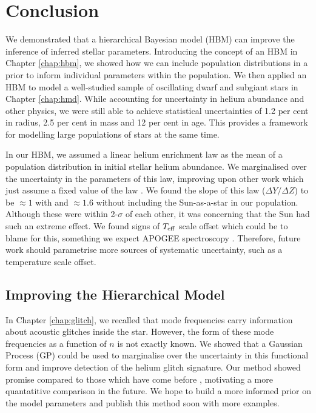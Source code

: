 %
%
%
%
%
\chapter{Conclusion}

We demonstrated that a hierarchical Bayesian model (HBM) can improve the inference of inferred stellar parameters. Introducing the concept of an HBM in Chapter \ref{chap:hbm}, we showed how we can include population distributions in a prior to inform individual parameters within the population. We then applied an HBM to model a well-studied sample of oscillating dwarf and subgiant stars in Chapter \ref{chap:hmd}. While accounting for uncertainty in helium abundance and other physics, we were still able to achieve statistical uncertainties of 1.2 per cent in radius, 2.5 per cent in mass and 12 per cent in age. This provides a framework for modelling large populations of stars at the same time.

In our HBM, we assumed a linear helium enrichment law as the mean of a population distribution in initial stellar helium abundance. We marginalised over the uncertainty in the parameters of this law, improving upon other work which just assume a fixed value of the law \citep[e.g.][]{Serenelli.Johnson.ea2017}. We found the slope of this law (\(\Delta Y/\Delta Z\)) to be \(\approx 1\) with and \(\approx 1.6\) without including the Sun-as-a-star in our population. Although these were within 2-\(\sigma\) of each other, it was concerning that the Sun had such an extreme effect. We found signs of \({T_\mathrm{eff}}\) scale offset which could be to blame for this, something we expect APOGEE spectroscopy \needcite. Therefore, future work should parametrise more sources of systematic uncertainty, such as a temperature scale offset.

\section{Improving the Hierarchical Model}

In Chapter \ref{chap:glitch}, we recalled that mode frequencies carry information about acoustic glitches inside the star. However, the form of these mode frequencies as a function of \(n\) is not exactly known. We showed that a Gaussian Process (GP) could be used to marginalise over the uncertainty in this functional form and improve detection of the helium glitch signature.  Our method showed promise compared to those which have come before \citep[e.g.][]{Verma.Raodeo.ea2019}, motivating a more quantatitive comparison in the future. We hope to build a more informed prior on the model parameters and publish this method soon with more examples.

